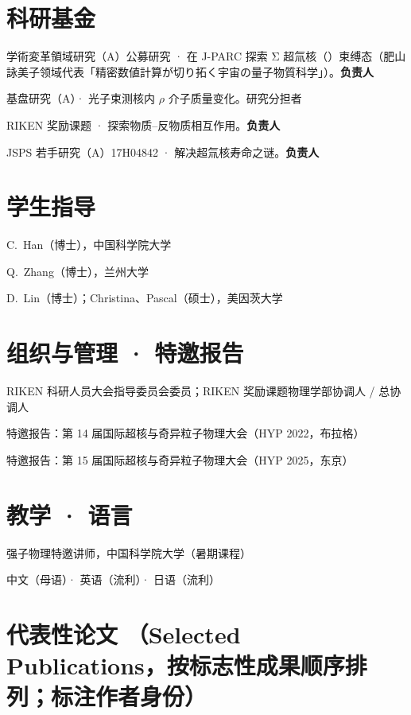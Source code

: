 \documentclass[a4paper,11pt,fontset=none]{ctexart}
\newcommand{\cvrow}[2]{%
  \noindent\makebox[2.7cm][l]{\textcolor{impblue}{\small\bfseries #1}}%
  \parbox[t]{\dimexpr\linewidth-2.8cm\relax}{#2}\par\vspace{3pt}}
\begin{document}
\begin{minipage}[t]{0.52\linewidth}
\section{科研基金}
\cvrow{2026--2027}{学術変革領域研究（A）公募研究 · 在 J-PARC 探索 Σ 超氚核（\hsig{3}{H}）束缚态（肥山詠美子领域代表「精密数値計算が切り拓く宇宙の量子物質科学」）。\textbf{负责人}}
\cvrow{2024--2028}{基盘研究（A）· 光子束测核内 $\rho$ 介子质量变化。研究分担者}
\cvrow{2023--2025}{RIKEN 奖励课题 · 探索物质--反物质相互作用。\textbf{负责人}}
\cvrow{2017--2020}{JSPS 若手研究（A）17H04842 · 解决超氚核寿命之谜。\textbf{负责人}}
\end{minipage}\hfill
\begin{minipage}[t]{0.44\linewidth}
\section{学生指导}
\cvrow{2017--2020}{C.\ Han（博士），中国科学院大学}
\cvrow{2012--2014}{Q.\ Zhang（博士），兰州大学}
\cvrow{2010--2011}{D.\ Lin（博士）；Christina、Pascal（硕士），美因茨大学}
\end{minipage}

\begin{minipage}[t]{0.52\linewidth}
\section{组织与管理 · 特邀报告}
\cvrow{2019--2021}{RIKEN 科研人员大会指导委员会委员；RIKEN 奖励课题物理学部协调人 / 总协调人}
\cvrow{2022}{特邀报告：第 14 届国际超核与奇异粒子物理大会（HYP 2022，布拉格）}
\cvrow{2025}{特邀报告：第 15 届国际超核与奇异粒子物理大会（HYP 2025，东京）}
\end{minipage}\hfill
\begin{minipage}[t]{0.44\linewidth}
\section{教学 · 语言}
\cvrow{2018/23/24}{强子物理特邀讲师，中国科学院大学（暑期课程）}
\cvrow{语言}{中文（母语）· 英语（流利）· 日语（流利）}
\end{minipage}

\section{代表性论文 \normalfont\small（Selected Publications，按标志性成果顺序排列；标注作者身份）}
\end{document}
